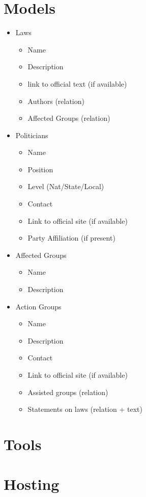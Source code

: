 \documentclass[12pt]{article}
\begin{document}
\section{Models}

\begin{itemize}
	\item[] Laws
	\begin{itemize}
		\item Name
		\item Description
		\item link to official text (if available)
		\item Authors (relation)
		\item Affected Groups (relation)
	\end{itemize}
	\item[] Politicians
	\begin{itemize}
		\item Name
		\item Position
		\item Level (Nat/State/Local)
		\item Contact
		\item Link to official site (if available)
		\item Party Affiliation (if present)
	\end{itemize}
	\item[] Affected Groups
	\begin{itemize}
		\item Name
		\item Description
	\end{itemize}
	\item[] Action Groups
	\begin{itemize}
		\item Name
		\item Description
		\item Contact
		\item Link to official site (if available)
		\item Assisted groups (relation)
		\item Statements on laws (relation + text)
	\end{itemize}
\end{itemize}

\section{Tools}



\section{Hosting}
\end{document}

